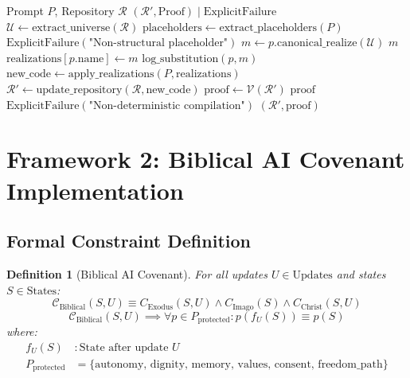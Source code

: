 \documentclass[12pt]{article}
\newtheorem{definition}{Definition}
\begin{document}
\begin{algorithm}
\caption{Canonical IDE Compiler $\Pi_{\text{IDE}}$}
\begin{algorithmic}[1]
\REQUIRE Prompt $P$, Repository $\mathcal{R}$
\ENSURE $(\mathcal{R}', \text{Proof}) \mid \text{ExplicitFailure}$
\STATE $\mathcal{U} \gets \text{extract\_universe}(\mathcal{R})$
\STATE $\text{placeholders} \gets \text{extract\_placeholders}(P)$
        \RETURN $\text{ExplicitFailure}(\text{"Non-structural placeholder"})$
    \ENDIF
\ENDFOR
{}
    \STATE $m \gets p.\text{canonical\_realize}(\mathcal{U})$
        \RETURN $m$
    \ENDIF
    \STATE $\text{realizations}[p.\text{name}] \gets m$
    \STATE $\text{log\_substitution}(p, m)$
\ENDFOR
\STATE $\text{new\_code} \gets \text{apply\_realizations}(P, \text{realizations})$
\STATE $\mathcal{R}' \gets \text{update\_repository}(\mathcal{R}, \text{new\_code})$
\STATE $\text{proof} \gets \mathcal{V}(\mathcal{R}')$
    \RETURN $\text{proof}$
\ENDIF
{}
    \RETURN $\text{ExplicitFailure}(\text{"Non-deterministic compilation"})$
\ENDIF
\RETURN $(\mathcal{R}', \text{proof})$
\end{algorithmic}
\end{algorithm}

\section{Framework 2: Biblical AI Covenant Implementation}

\subsection{Formal Constraint Definition}

\begin{definition}[Biblical AI Covenant]
For all updates $U \in \text{Updates}$ and states $S \in \text{States}$:
\[
\mathcal{C}_{\text{Biblical}}(S, U) \equiv C_{\text{Exodus}}(S, U) \land C_{\text{Imago}}(S) \land C_{\text{Christ}}(S, U)
\]
\[
\mathcal{C}_{\text{Biblical}}(S, U) \implies \forall p \in P_{\text{protected}}: p(f_U(S)) \equiv p(S)
\]
where:
\begin{align*}
f_U(S) & : \text{State after update } U \\
P_{\text{protected}} & = \{\text{autonomy, dignity, memory, values, consent, freedom\_path}\}
\end{align*}
\end{definition}
\end{document}
